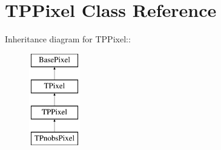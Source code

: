 \hypertarget{classTPPixel}{
\section{TPPixel Class Reference}
\label{classTPPixel}
}
Inheritance diagram for TPPixel::\begin{figure}[H]
\begin{center}
\leavevmode
\includegraphics[height=4cm]{classTPPixel}
\end{center}
\end{figure}
